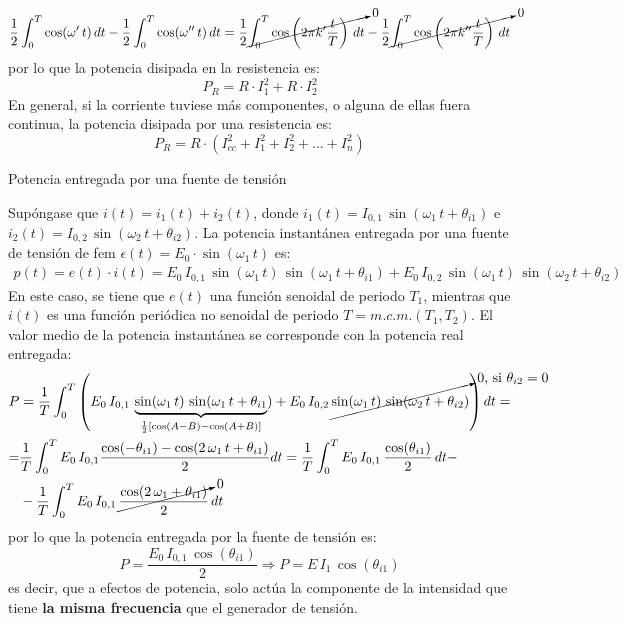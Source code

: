\documentclass[11pt]{book} %
\makeatletter
\numberwithin{dummy}{section}
\theoremstyle{ocrenumbox}
\theoremstyle{blacknumex}
\theoremstyle{blacknumbox}
\theoremstyle{ocrenum}
\renewcommand{\subsubsection}{\@startsection {subsubsection}{3}{\z@}
{-2ex \@plus -0.1ex \@minus -.2ex}
{.2ex \@plus.2ex }
{\normalfont\small\sffamily\bfseries}}
\newlength\esp
\makeatother
\begin{document}
\begin{equation*}
    \dfrac{1}{2}\int_0^T\cos(\omega'\,t)\,dt-\dfrac{1}{2}\int_0^T\cos(\omega''\,t)\,dt=\dfrac{1}{2}\cancelto{0}{\int_0^T \cos\left(2\pi k'\dfrac{t}{T}\right)\,dt}-\dfrac{1}{2}\cancelto{0}{\int_0^T\cos\left(2\pi k''\dfrac{t}{T}\right)\,dt}
\end{equation*}
por lo que la potencia disipada en la resistencia es:
\begin{equation*}
   P_R=R\cdot I_1^2+R\cdot I_2^2
\end{equation*}
En general, si la corriente tuviese más componentes, o alguna de ellas fuera continua, la potencia disipada por una resistencia es:
\begin{equation}\label{eq.P_R_superposicion}
    \boxed{P_R=R\cdot\left(I_{cc}^2+I_1^2+I_2^2+...+I_n^2 \right)}
\end{equation}

    \subsubsection{Potencia entregada por una fuente de tensión}
    
    Supóngase que $i(t) = i_1(t) + i_2(t)$, donde $i_1(t)=I_{0,1}\,\sin(\omega_1\,t+\theta_{i1})$ e $i_2(t)=I_{0,2}\,\sin(\omega_2\,t+\theta_{i2})$. La potencia instantánea entregada por una fuente de tensión de fem $\epsilon(t)=E_0\cdot\sin(\omega_1\,t)$ es:
\begin{align*}
  p(t) = e(t)\cdot i(t) = E_0\, I_{0,1}\,\sin(\omega_1\,t)\,\sin(\omega_1\,t+\theta_{i1}) + E_0\, I_{0,2}\,\sin(\omega_1\,t)\,\sin(\omega_2\,t+\theta_{i2})
\end{align*} 
En este caso, se tiene que $e(t)$ una función senoidal de periodo $T_1$, mientras que $i(t)$ es una función periódica no senoidal de periodo $T=m.c.m.(T_1,T_2)$. El valor medio de la potencia instantánea se corresponde con la potencia real entregada:
\begin{align*}
    P&=\dfrac{1}{T}\int_0^{T}\left( E_0\, I_{0,1}\,\underbrace{\sin(\omega_1\,t)\,\sin(\omega_1\,t+\theta_{i1}}_{\frac{1}{2}\left[\cos(A-B)-\cos(A+B)\right]}) + E_0\, I_{0,2}\,\cancelto{\text{0, si $\theta_{i2}=0$}}{\sin(\omega_1\,t)\,\sin(\omega_2\,t+\theta_{i2})}\right)dt=\\
    =&\dfrac{1}{T}\int_0^T E_0\,I_{0,1}\dfrac{\cos(-\theta_{i1})-\cos(2\,\omega_1\,t+\theta_{i1})}{2}dt =\dfrac{1}{T}\int_0^T E_0\,I_{0,1}\,\dfrac{\cos(\theta_{i1})}{2}\,dt-\\
    &-\dfrac{1}{T}\int_0^T E_0\,I_{0,1}\,\cancelto{0}{\dfrac{\cos(2\,\omega_1+\theta_{i1})}{2}}\,dt
\end{align*}
por lo que la potencia entregada por la fuente de tensión es:
\begin{equation}\label{eq.P_E_superposicion}
    P=\dfrac{E_0\,I_{0,1}\,\cos(\theta_{i1})}{2}\Rightarrow \boxed{P=E\,I_1\,\cos(\theta_{i1})}
\end{equation}
es decir, que a efectos de potencia, solo actúa la componente de la intensidad que tiene \textbf{la misma frecuencia} que el generador de tensión.
\end{document}
